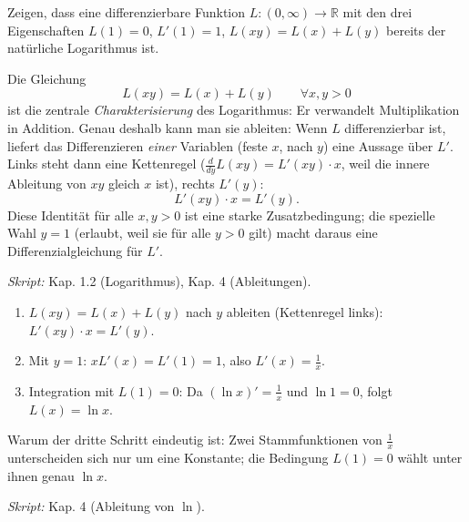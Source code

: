 

Zeigen, dass eine differenzierbare Funktion $L\colon(0,\infty)\to\mathbb R$
mit den drei Eigenschaften $L(1)=0$, $L'(1)=1$, $L(xy)=L(x)+L(y)$ bereits
der natürliche Logarithmus ist.

\begin{werkzeugkasten}
Die Gleichung
\begin{equation*}
  L(xy)=L(x)+L(y)\qquad\forall x,y>0
\end{equation*}
ist die zentrale \emph{Charakterisierung} des Logarithmus: Er verwandelt
Multiplikation in Addition. Genau deshalb kann man sie ableiten: Wenn
$L$ differenzierbar ist, liefert das Differenzieren \emph{einer} Variablen
(feste $x$, nach $y$) eine Aussage über $L'$. Links steht dann eine
Kettenregel ($\frac d{dy}L(xy)=L'(xy)\cdot x$, weil die innere Ableitung
von $xy$ gleich $x$ ist), rechts $L'(y)$:
\begin{equation*}
  L'(xy)\cdot x=L'(y).
\end{equation*}
Diese Identität für alle $x,y>0$ ist eine starke Zusatzbedingung; die
spezielle Wahl $y=1$ (erlaubt, weil sie für alle $y>0$ gilt) macht daraus
eine Differenzialgleichung für $L'$.

\textit{Skript:} Kap. 1.2 (Logarithmus), Kap. 4 (Ableitungen).
\end{werkzeugkasten}

\begin{werkzeugkasten}
\begin{enumerate}
  \item $L(xy)=L(x)+L(y)$ nach $y$ ableiten (Kettenregel links):
        $L'(xy)\cdot x=L'(y)$.
  \item Mit $y=1$: $xL'(x)=L'(1)=1$, also $L'(x)=\frac1x$.
  \item Integration mit $L(1)=0$: Da $(\ln x)'=\frac1x$ und $\ln 1=0$,
        folgt $L(x)=\ln x$.
\end{enumerate}
Warum der dritte Schritt eindeutig ist: Zwei Stammfunktionen von
$\frac1x$ unterscheiden sich nur um eine Konstante; die Bedingung
$L(1)=0$ wählt unter ihnen genau $\ln x$.

\textit{Skript:} Kap. 4 (Ableitung von $\ln$).
\end{werkzeugkasten}

